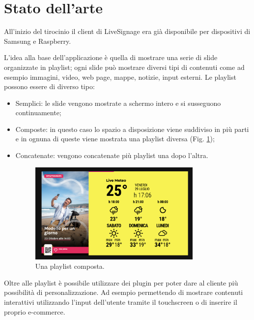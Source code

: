 \section{Stato dell'arte}\label{statoarte}

All'inizio del tirocinio il client di LiveSignage era già disponibile per dispositivi di Samsung e Raspberry.  

L'idea alla base dell'applicazione è quella di mostrare una serie di slide organizzate in playlist; ogni slide può mostrare diversi tipi di contenuti come ad esempio immagini, video, web page, mappe, notizie, input esterni. Le playlist possono essere di diverso tipo:

\begin{itemize}
    \item Semplici: le slide vengono mostrate a schermo intero e si susseguono continuamente;
    \item Composte: in questo caso lo spazio a disposizione viene suddiviso in più parti e in ognuna di queste viene mostrata una playlist diversa (Fig. \ref*{fig:playlist-composta});
    \item Concatenate: vengono concatenate più playlist una dopo l'altra.
    \begin{figure}[!htb]
        \centering
        \includegraphics[width= 0.8\textwidth]{images/Introduzione/playlist-composta.png} 
        \caption{Una playlist composta.} 
        \label{fig:playlist-composta}
    \end{figure}
\end{itemize}


Oltre alle playlist è possibile utilizzare dei plugin per poter dare al cliente più possibilità di personalizzazione. Ad esempio permettendo di  mostrare contenuti interattivi utilizzando l'input dell'utente tramite il touchscreen o di inserire il proprio e-commerce.

